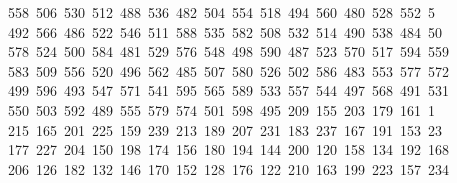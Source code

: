 \begin{tabbing}
\ 558\ 506\ 530\ 512\ 488\ 536\ 482\ 504\ 554\ 518\ 494\ 560\ 480\ 528\ 552\ 5\\[0pt]
\ 492\ 566\ 486\ 522\ 546\ 511\ 588\ 535\ 582\ 508\ 532\ 514\ 490\ 538\ 484\ 50\\[0pt]
\ 578\ 524\ 500\ 584\ 481\ 529\ 576\ 548\ 498\ 590\ 487\ 523\ 570\ 517\ 594\ 559\\[0pt]
\>\ 583\ 509\ 556\ 520\ 496\ 562\ 485\ 507\ 580\ 526\ 502\ 586\ 483\ 553\ 577\ 572\\[0pt]
\>\ 499\ 596\ 493\ 547\ 571\ 541\ 595\ 565\ 589\ 533\ 557\ 544\ 497\ 568\ 491\ 531\ \\[0pt]
\ 550\ 503\ 592\ 489\ 555\ 579\ 574\ 501\ 598\ 495\ 209\ 155\ 203\ 179\ 161\ 1\\[0pt]
\ 215\ 165\ 201\ 225\ 159\ 239\ 213\ 189\ 207\ 231\ 183\ 237\ 167\ 191\ 153\ 23\\[0pt]
\ 177\ 227\ 204\ 150\ 198\ 174\ 156\ 180\ 194\ 144\ 200\ 120\ 158\ 134\ 192\ 168\\[0pt]
\>\ 206\ 126\ 182\ 132\ 146\ 170\ 152\ 128\ 176\ 122\ 210\ 163\ 199\ 223\ 157\ 234\\[0pt]

\end{tabbing}
